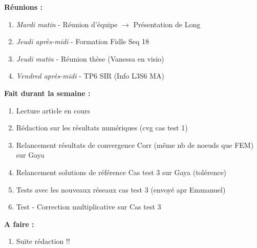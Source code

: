 \textbf{Réunions :}
\begin{enumerate}[label=\textbullet]
	\item \textit{Mardi matin} - Réunion d'équipe $\rightarrow$ Présentation de Long
	\item \textit{Jeudi après-midi} - Formation Fidle Seq 18
	\item \textit{Jeudi matin} - Réunion thèse (Vanessa en visio)
	\item \textit{Vendred après-midi} - TP6 SIR (Info L3S6 MA)
\end{enumerate}
\textbf{Fait durant la semaine :}
\begin{enumerate}[label=\textbullet]
	\item Lecture article en cours
	\item Rédaction sur les résultats numériques (cvg cas test 1)
	\item Relancement résultats de convergence Corr (même nb de noeuds que FEM) sur Gaya
	\item Relancement solutions de référence Cas test 3 sur Gaya (tolérence)
	\item Tests avec les nouveaux réseaux cas test 3 (envoyé apr Emmanuel)
	\item Test - Correction multiplicative sur Cas test 3
\end{enumerate}
\textbf{A faire :}
\begin{enumerate}[label=\textbullet]
	\item Suite rédaction !!
\end{enumerate}